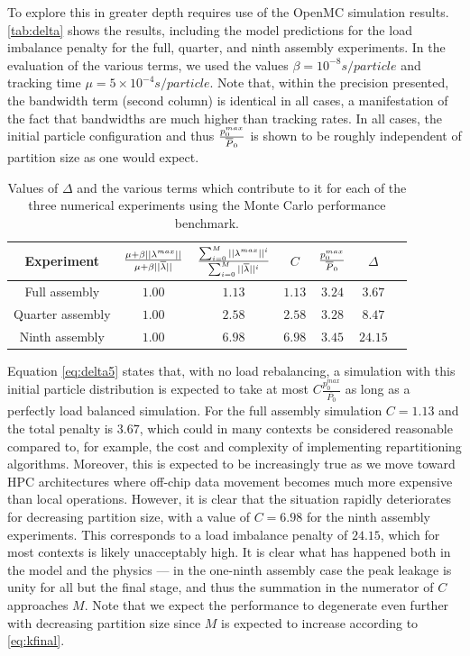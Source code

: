 To explore this in greater depth requires use of the OpenMC simulation
results. \autoref{tab:delta} shows the results, including the model predictions
for the load imbalance penalty for the full, quarter, and ninth assembly
experiments. In the evaluation of the various terms, we used the values $\beta =
10^{-8} \unit{s/particle}$ and tracking time $\mu = 5\times10^{-4}
\unit{s/particle}$. Note that, within the precision presented, the bandwidth
term (second column) is identical in all cases, a manifestation of the fact that
bandwidths are much higher than tracking rates. In all cases, the initial
particle configuration and thus $\frac{p_0^{max}}{\overline{P}_0}$ is shown to be
roughly independent of partition size as one would expect.
\begin{table}
  \centering
  \begin{tabular}{c c c c c c c}
    \toprule
    Experiment & $\frac{\mu + \beta ||\lambda^{max}||}{\mu + \beta ||\overline{\lambda}||}$ &
    $\frac{\sum_{i=0}^M ||{\lambda^{max}}||^i}{\sum_{i=0}^M ||\overline{\lambda}||^i}$ & $C$
    & $\frac{p_0^{max}}{\overline{P}_0}$ & $\Delta$ \\
    \midrule
    Full assembly & $1.00$ & $1.13$ & $1.13$ & $3.24$ & $3.67$\\
    Quarter assembly & $1.00$ & $2.58$ & $2.58$ & $3.28$ & $8.47$\\
    Ninth assembly & $1.00$ & $6.98$ & $6.98$ & $3.45$ & $24.15$\\
    \bottomrule
  \end{tabular}
  \caption{Values of $\Delta$ and the various terms which contribute to it for
    each of the three numerical experiments using the Monte Carlo performance
    benchmark.}
  \label{tab:delta}
\end{table}

Equation \eqref{eq:delta5} states that, with no load rebalancing, a simulation
with this initial particle distribution is expected to take at most
$C\frac{p_0^{max}}{\overline{P_0}}$ as long as a perfectly load balanced
simulation. For the full assembly simulation $C=1.13$ and the total penalty is
$3.67$, which could in many contexts be considered reasonable compared to, for
example, the cost and complexity of implementing repartitioning
algorithms. Moreover, this is expected to be increasingly true as we move toward
HPC architectures where off-chip data movement becomes much more expensive than
local operations. However, it is clear that the situation rapidly deteriorates
for decreasing partition size, with a value of $C=6.98$ for the ninth assembly
experiments. This corresponds to a load imbalance penalty of $24.15$, which for
most contexts is likely unacceptably high. It is clear what has happened both in
the model and the physics --- in the one-ninth assembly case the peak leakage is
unity for all but the final stage, and thus the summation in the numerator of
$C$ approaches $M$. Note that we expect the performance to degenerate even
further with decreasing partition size since $M$ is expected to increase
according to \eqref{eq:kfinal}.

